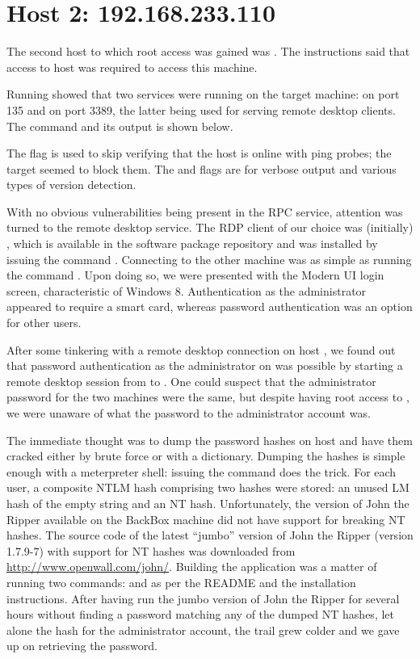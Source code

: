\section*{Host 2: 192.168.233.110}
The second host to which root access was gained was . The instructions said that access to host  was required to access this machine.

Running  showed that two services were running on the target machine:  on port 135 and  on port 3389, the latter being used for serving remote desktop clients. The  command and its output is shown below.

The  flag is used to skip verifying that the host is online with ping probes; the target seemed to block them. The  and  flags are for verbose output and various types of version detection.

With no obvious vulnerabilities being present in the RPC service, attention was turned to the remote desktop service. The RDP client of our choice was (initially) , which is available in the software package repository and was installed by issuing the command . Connecting to the other machine was as simple as running the command . Upon doing so, we were presented with the Modern UI login screen, characteristic of Windows 8. Authentication as the administrator appeared to require a smart card, whereas password authentication was an option for other users.

After some tinkering with a remote desktop connection on host , we found out that password authentication as the administrator on  was possible by starting a remote desktop session from  to . One could suspect that the administrator password for the two machines were the same, but despite having root access to , we were unaware of what the password to the administrator account was.

The immediate thought was to dump the password hashes on host  and have them cracked either by brute force or with a dictionary. Dumping the hashes is simple enough with a meterpreter shell: issuing the command  does the trick. For each user, a composite NTLM hash comprising two hashes were stored: an unused LM hash of the empty string and an NT hash\cite{wikipedia_NTLM}. Unfortunately, the version of John the Ripper available on the BackBox machine did not have support for breaking NT hashes. The source code of the latest ``jumbo'' version of John the Ripper (version 1.7.9-7) with support for NT hashes was downloaded from \url{http://www.openwall.com/john/}. Building the application was a matter of running two  commands:  and  as per the README and the installation instructions. After having run the jumbo version of John the Ripper for several hours without finding a password matching any of the dumped NT hashes, let alone the hash for the administrator account, the trail grew colder and we gave up on retrieving the password.

